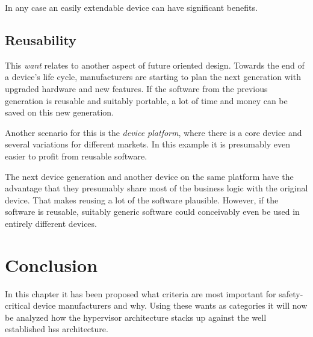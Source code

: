In any case an easily extendable device can have significant benefits.
\subsection{Reusability}
This \textit{want} relates to another aspect of future oriented design. Towards the end of a device's life cycle, manufacturers are starting to plan the next generation with upgraded hardware and new features. If the software from the previous generation is reusable and suitably portable, a lot of time and money can be saved on this new generation.

Another scenario for this is the \textit{device platform}, where there is a core device and several variations for different markets. In this example it is presumably even easier to profit from reusable software.

The next device generation and another device on the same platform have the advantage that they presumably share most of the business logic with the original device. That makes reusing a lot of the software plausible. However, if the software is reusable, suitably generic software could conceivably even be used in entirely different devices.

\section{Conclusion}
In this chapter it has been proposed what criteria are most important for safety-critical device manufacturers and why. Using these wants as categories it will now be analyzed how the hypervisor architecture stacks up against the well established \acrshort{hss} architecture.
